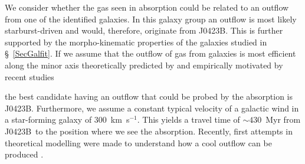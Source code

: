 \documentclass[a4paper,fleqn,usenatbib]{mnras}
\newcommand{\GalB}{J0423B}
\begin{document}
We consider whether the gas seen in absorption could be related to an outflow from one of the identified galaxies. In this galaxy group an outflow is most likely starburst-driven and would, therefore, originate from \GalB. This is further supported by the morpho-kinematic properties of the galaxies studied in \S~\ref{SecGalfit}. If we assume that the outflow of gas from galaxies is most efficient along the minor axis theoretically predicted by \mbox{\citet{Keres2009galaxies, Stewart2011orbiting}} and empirically motivated by recent studies {\citep[e.g.][]{Bordoloi2011radial, Bouche2012enriched, Schroetter2015sinfoni} the best candidate having an outflow that could be probed by the absorption is \GalB. Furthermore, we assume a constant typical velocity of a galactic wind in a star-forming galaxy of $300$~km~s$^{-1}$\mbox{\citep{Veilleux2005galactic}}. This yields a travel time of $\sim 430$~Myr from \GalB\ to the position where we see the absorption.
Recently, first attempts in theoretical modelling were made to understand how a cool outflow can be produced \mbox{\citep{Richings2017origin}}.


}
\end{document}
